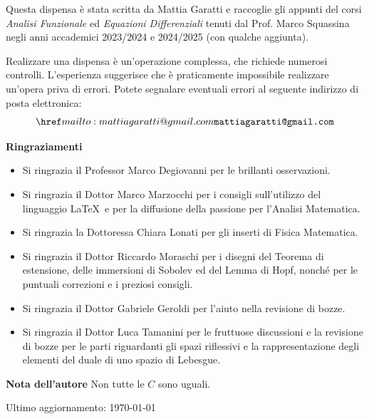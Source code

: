 


\thispagestyle{empty}



Questa dispensa è stata scritta da Mattia Garatti e raccoglie gli appunti del corsi \emph{Analisi Funzionale} ed \emph{Equazioni Differenziali} tenuti dal Prof. Marco Squassina negli anni accademici 2023/2024 e 2024/2025 (con qualche aggiunta).

Realizzare una dispensa è un'operazione complessa, che richiede numerosi controlli. L'esperienza suggerisce che è praticamente impossibile realizzare un'opera priva di errori. Potete segnalare eventuali errori al seguente indirizzo di posta elettronica:
\[ \mail{mattiagaratti@gmail.com} \]


\noindent \textbf{Ringraziamenti} 
\begin{itemize}
	\item Si ringrazia il Professor Marco Degiovanni per le brillanti osservazioni.
	\item Si ringrazia il Dottor Marco Marzocchi per i consigli sull'utilizzo del linguaggio \LaTeX $\,$ e per la diffusione della passione per l'Analisi Matematica.
	\item Si ringrazia la Dottoressa Chiara Lonati per gli inserti di Fisica Matematica.
	\item Si ringrazia il Dottor Riccardo Moraschi per i disegni del Teorema di estensione, delle immersioni di Sobolev ed del Lemma di Hopf, nonché per le puntuali correzioni e i preziosi consigli.
	\item Si ringrazia il Dottor Gabriele Geroldi per l'aiuto nella revisione di bozze.
	\item Si ringrazia il Dottor Luca Tamanini per le fruttuose discussioni e la revisione di bozze per le parti riguardanti gli spazi riflessivi e la rappresentazione degli elementi del duale di uno spazio di Lebesgue.
\end{itemize}


\noindent \textbf{Nota dell'autore} Non tutte le $C$ sono uguali.

\vfill

\begin{flushright}
	Ultimo aggiornamento: \today
\end{flushright}